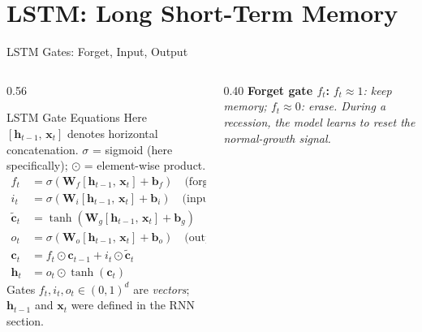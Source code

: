 \documentclass[aspectratio=169, 10pt]{beamer}
\begin{document}
\section{LSTM: Long Short-Term Memory}


\begin{frame}{LSTM Gates: Forget, Input, Output}
  \begin{columns}[T]
    \begin{column}{0.56\textwidth}
      \begin{definitionbox}{LSTM Gate Equations}
        \footnotesize{}
        Here $[\mathbf{h}_{t-1},\,\mathbf{x}_t]$ denotes horizontal concatenation.
        $\sigma$ = sigmoid (here specifically); $\odot$ = element-wise product.
        \vspace{-2pt}
        \begin{align*}
          f_t &= \sigma(\mathbf{W}_f [\mathbf{h}_{t-1},\,\mathbf{x}_t]
                 + \mathbf{b}_f)
                 \quad\text{(forget)}\\
          i_t &= \sigma(\mathbf{W}_i [\mathbf{h}_{t-1},\,\mathbf{x}_t]
                 + \mathbf{b}_i)
                 \quad\text{(input)}\\
          \tilde{\mathbf{c}}_t &= \tanh(\mathbf{W}_g [\mathbf{h}_{t-1},\,\mathbf{x}_t]
                 + \mathbf{b}_g)
                 \quad\text{(candidate)}\\
          o_t &= \sigma(\mathbf{W}_o [\mathbf{h}_{t-1},\,\mathbf{x}_t]
                 + \mathbf{b}_o)
                 \quad\text{(output)}\\[2pt]
          \mathbf{c}_t &= f_t \odot \mathbf{c}_{t-1}
                 + i_t \odot \tilde{\mathbf{c}}_t\\
          \mathbf{h}_t &= o_t \odot \tanh(\mathbf{c}_t)
        \end{align*}
        Gates $f_t, i_t, o_t \in (0,1)^d$ are \emph{vectors}; $\mathbf{h}_{t-1}$ and $\mathbf{x}_t$ were defined in the RNN section.
      \end{definitionbox}
    \end{column}
    \begin{column}{0.40\textwidth}
      \footnotesize
      \textbf{Forget gate $f_t$:}
      \textit{$f_t \approx 1$: keep memory; $f_t \approx 0$: erase.
      During a recession, the model learns to reset the normal-growth signal.}


\end{column}
\end{columns}
\end{frame}
\end{document}
